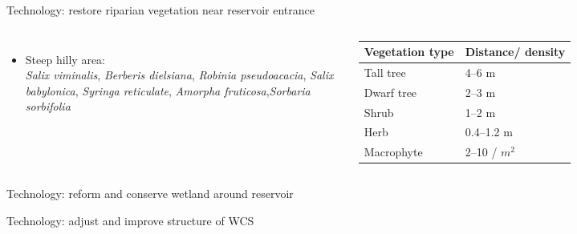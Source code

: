 \begin{frame}{Technology: restore riparian vegetation near reservoir entrance}
\begin{columns}[T,onlytextwidth]
\begin{itemize}
		\small
		\item Steep hilly area:\\
		\tiny
		\emph{Salix viminalis}, \emph{Berberis dielsiana}, \emph{Robinia pseudoacacia}, \emph{Salix babylonica}, \emph{Syringa reticulate},
		\textcolor{colshrub}{\emph{Amorpha fruticosa}},\textcolor{colshrub}{\emph{Sorbaria sorbifolia}}\\
	\end{itemize}
	
	\begin{table}
		\begin{tabular}{p{5em}| p{5em}}
			\toprule
			Vegetation type&Distance/ density\\
			\midrule
			Tall tree&4--6 m\\
			Dwarf tree&2--3 m\\
			\textcolor{colshrub}{Shrub}&1--2 m\\
			\textcolor{colherb}{Herb}&0.4--1.2 m\\
			\textcolor{colherb}{Macrophyte}&2--10  / $m^2$\\
			\bottomrule
		\end{tabular}
	\end{table}
		
\end{columns}
\end{frame}

\begin{frame}{Technology: reform and conserve wetland around reservoir}

\end{frame}

\begin{frame}{Technology: adjust and improve structure of WCS}

\end{frame}

